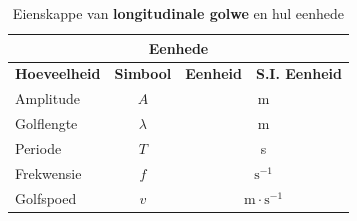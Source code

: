 \begin{table}[H]
\begin{center}
\begin{tabular}{|l|c|c|c|}\hline \hline 
\multicolumn{4}{|c|}{\textbf{Eenhede}}\\ \hline \hline
\textbf{Hoeveelheid} & \textbf{Simbool} & \textbf{Eenheid} & \textbf{S.I. Eenheid}\\ \hline
Amplitude & $A$ & \multicolumn{2}{c|}{m} \\ \hline
Golflengte & $\lambda$ & \multicolumn{2}{c|}{m}  \\ \hline
Periode & $T$ & \multicolumn{2}{c|}{s}  \\ \hline
Frekwensie & $f$ & \multicolumn{2}{c|}{$\text{s}^{-1}$}  \\ \hline
Golfspoed & $v$ & \multicolumn{2}{c|}{$\text{m} \cdot \text{s}^{-1}$} \\ \hline
\end{tabular}
\end{center}
\caption{Eienskappe van \textbf{longitudinale golwe} en hul eenhede}
\label{table:electricity::units}
\end{table}
   \label{m38783*cid9}


